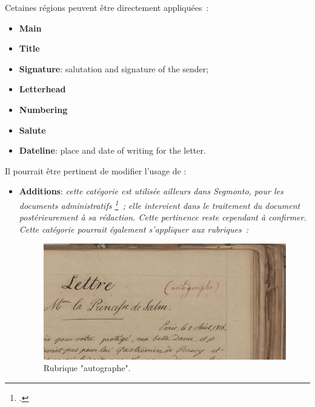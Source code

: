 \documentclass[a4paper,12pt,twoside]{book}
\newcommand{\langue}[1]{\emph{#1}}
\begin{document}
	        Cetaines régions peuvent être directement appliquées :
			\begin{itemize}
				\item \textbf{Main}
				\item \textbf{Title}
				\item \textbf{Signature}: salutation and signature of the sender;
				\item \textbf{Letterhead}
				\item \textbf{Numbering}
				\item \textbf{Salute}
				\item \textbf{Dateline}: place and date of writing for the letter.
			\end{itemize}
			
			Il pourrait être pertinent de modifier l'usage de :
			\begin{itemize}
				\item \textbf{Additions}: \langue{cette catégorie est utilisée ailleurs dans Segmonto, pour les documents administratifs			\selectlanguage{french}\footcite{chagueDocumentsAdministratifsXIXe2021}~; elle intervient dans le traitement du document postérieurement à sa rédaction. Cette pertinence reste cependant à confirmer. Cette catégorie pourrait également s'appliquer aux rubriques~:}
				\begin{figure}[!h]
					\centering
					\includegraphics{img/CdS02_Konv002-02_0064_detail.jpg}
					\caption{Rubrique "autographe".}
					\label{autographe}%
				\end{figure}
			\end{itemize}
\end{document}
